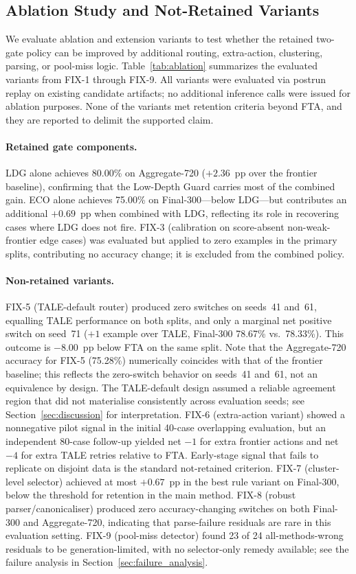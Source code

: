 \subsection{Ablation Study and Not-Retained Variants}
\label{sec:ablation}

We evaluate ablation and extension variants to test whether the retained
two-gate policy can be improved by additional routing, extra-action,
clustering, parsing, or pool-miss logic.
Table~\ref{tab:ablation} summarizes the evaluated variants from FIX-1
through FIX-9.
All variants were evaluated via postrun replay on existing candidate
artifacts; no additional inference calls were issued for ablation purposes.
None of the variants met retention criteria beyond FTA, and they are
reported to delimit the supported claim.

\paragraph{Retained gate components.}
LDG alone achieves 80.00\% on Aggregate-720 ($+2.36$~pp over the frontier
baseline), confirming that the Low-Depth Guard carries most of the combined
gain.
ECO alone achieves 75.00\% on Final-300---below LDG---but contributes an
additional $+0.69$~pp when combined with LDG, reflecting its role in
recovering cases where LDG does not fire.
FIX-3 (calibration on score-absent non-weak-frontier edge cases) was
evaluated but applied to zero examples in the primary splits, contributing
no accuracy change; it is excluded from the combined policy.

\paragraph{Non-retained variants.}
FIX-5 (TALE-default router) produced zero switches on seeds~41 and~61,
equalling TALE performance on both splits, and only a marginal net positive
switch on seed~71 ($+1$ example over TALE, Final-300 78.67\% vs.\ 78.33\%).
This outcome is $-8.00$~pp below FTA on the same split.
Note that the Aggregate-720 accuracy for FIX-5 (75.28\%) numerically
coincides with that of the frontier baseline; this reflects the zero-switch
behavior on seeds~41 and~61, not an equivalence by design.
The TALE-default design assumed a reliable agreement region that did not
materialise consistently across evaluation seeds; see
Section~\ref{sec:discussion} for interpretation.
FIX-6 (extra-action variant) showed a nonnegative pilot signal in the
initial 40-case overlapping evaluation, but an independent 80-case follow-up
yielded net $-1$ for extra frontier actions and net $-4$ for extra TALE
retries relative to FTA.
Early-stage signal that fails to replicate on disjoint data is the standard
not-retained criterion.
FIX-7 (cluster-level selector) achieved at most $+0.67$~pp in the best rule
variant on Final-300, below the threshold for retention in the main method.
FIX-8 (robust parser/canonicaliser) produced zero accuracy-changing switches
on both Final-300 and Aggregate-720, indicating that parse-failure residuals
are rare in this evaluation setting.
FIX-9 (pool-miss detector) found 23 of 24 all-methods-wrong residuals to be
generation-limited, with no selector-only remedy available; see the failure
analysis in Section~\ref{sec:failure_analysis}.
